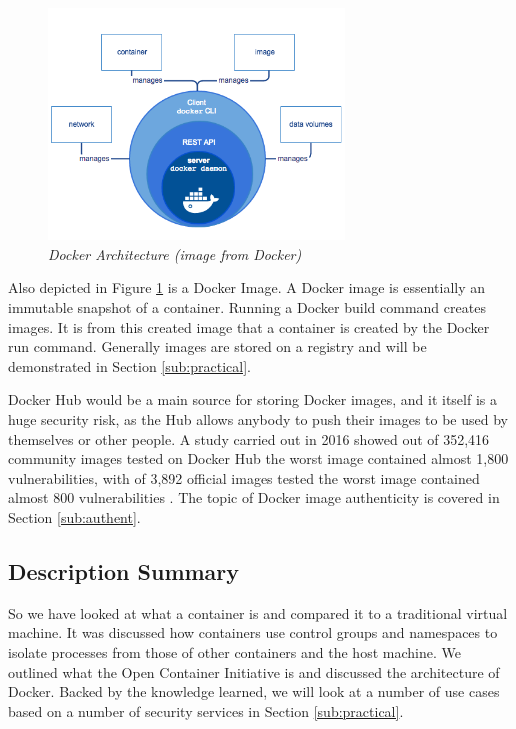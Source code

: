 \begin{figure}[!ht]
\centering
\includegraphics*[width=0.7\textwidth]{images/docker-arch.png}
\caption{\em Docker Architecture (image from Docker)}
\label{img:docker-arch}
\end{figure}

Also depicted in Figure \ref{img:docker-arch} is a Docker Image. A Docker image is essentially an immutable snapshot of a container. Running a Docker build command creates images. It is from this created image that a container is created by the Docker run command. Generally images are stored on a registry and will be demonstrated in Section \ref{sub:practical}. 

Docker Hub would be a main source for storing Docker images, and it itself is a huge security risk, as the Hub allows anybody to push their images to be used by themselves or other people. A study carried out in 2016 showed out of 352,416 community images tested on Docker Hub the worst image contained almost 1,800 vulnerabilities, with of 3,892 official images tested the worst image contained almost 800 vulnerabilities \citep{colyer_2017}. The topic of Docker image authenticity is covered in Section \ref{sub:authent}.

\subsection{Description Summary}
So we have looked at what a container is and compared it to a traditional virtual machine. It was discussed how containers use control groups and namespaces to isolate processes from those of other containers and the host machine. We outlined what the Open Container Initiative is and discussed the architecture of Docker. Backed by the knowledge learned, we will look at a number of use cases based on a number of security services in Section \ref{sub:practical}.





